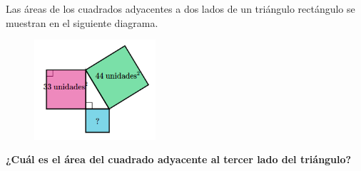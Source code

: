 \question[15]  Las áreas de los cuadrados adyacentes a dos lados de un triángulo rectángulo se muestran
en el siguiente diagrama.
\begin{figure}[H]
    \begin{center}
        \includegraphics[width=0.4\textwidth]{../images/area2.png}
    \end{center}
    \caption{}
    \label{fig:area2}
\end{figure}
\textbf{¿Cuál es el área del cuadrado adyacente al tercer lado del triángulo?}